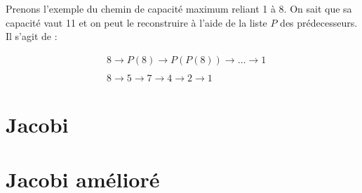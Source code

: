 \documentclass{article}
\begin{document}
Prenons l'exemple du chemin de capacité maximum reliant 1 à 8. On sait
que sa capacité vaut 11 et on peut le reconstruire à l'aide de la
liste $P$ des prédecesseurs. Il s'agit de :

\begin{align*}
  &8 \rightarrow P(8) \rightarrow P(P(8)) \rightarrow \dots \rightarrow 1\\\\
  &8 \rightarrow 5 \rightarrow 7 \rightarrow 4 \rightarrow 2 \rightarrow 1
\end{align*}

\section{Jacobi}

\section{Jacobi amélioré}
\end{document}

